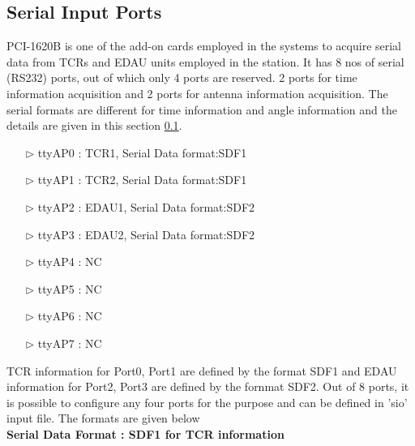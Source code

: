 \subsection{Serial Input Ports}
\label{SectionSIO}
PCI-1620B is one of the add-on cards  employed in the systems to acquire serial data from TCRs and EDAU units employed in the station. It has 8 nos of serial (RS232) ports, out of which only 4 ports are reserved. 2 ports for time information acquisition and 2 ports for antenna information acquisition. The serial formats are different for time information and angle information and the details are given in this section \ref{SectionSIO}.
\begin{enumerate}
	\item [$\rhd$] ttyAP0 : TCR1, Serial Data format:SDF1
	\item [$\rhd$] ttyAP1 : TCR2, Serial Data format:SDF1
	\item [$\rhd$] ttyAP2 : EDAU1, Serial Data format:SDF2
	\item [$\rhd$] ttyAP3 : EDAU2, Serial Data format:SDF2
	\item [$\rhd$] ttyAP4 : NC
	\item [$\rhd$] ttyAP5 : NC
	\item [$\rhd$] ttyAP6 : NC
	\item [$\rhd$] ttyAP7 : NC
\end{enumerate}
TCR information for Port0, Port1 are defined by the format SDF1 and EDAU information for Port2, Port3 are defined by the fornmat SDF2. Out of 8 ports, it is possible to configure any four ports for the purpose and can be defined in 'sio' input file. The formats are given below\\
\textbf{Serial Data Format : SDF1 for TCR information}
